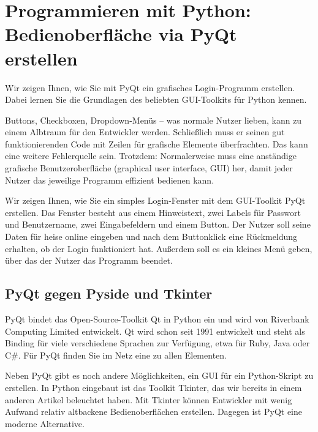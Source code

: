%
%
%



\chapter{Programmieren mit Python: Bedienoberfläche via PyQt erstellen}

Wir zeigen Ihnen, wie Sie mit PyQt ein grafisches Login-Programm erstellen. Dabei lernen Sie die Grundlagen des beliebten GUI-Toolkits für Python kennen.

Buttons, Checkboxen, Dropdown-Menüs – was normale Nutzer lieben, kann zu einem Albtraum für den Entwickler werden. Schließlich muss er seinen gut funktionierenden Code mit Zeilen für grafische Elemente überfrachten. Das kann eine weitere Fehlerquelle sein. Trotzdem: Normalerweise muss eine anständige grafische Benutzeroberfläche (graphical user interface, GUI) her, damit jeder Nutzer das jeweilige Programm effizient bedienen kann.

Wir zeigen Ihnen, wie Sie ein simples Login-Fenster mit dem GUI-Toolkit PyQt erstellen. Das Fenster besteht aus einem Hinweistext, zwei Labels für Passwort und Benutzername, zwei Eingabefeldern und einem Button. Der Nutzer soll seine Daten für heise online eingeben und nach dem Buttonklick eine Rückmeldung erhalten, ob der Login funktioniert hat. Außerdem soll es ein kleines Menü geben, über das der Nutzer das Programm beendet.

\section{PyQt gegen Pyside und Tkinter}


PyQt bindet das Open-Source-Toolkit Qt in Python ein und wird von Riverbank Computing Limited entwickelt. Qt wird schon seit 1991 entwickelt und steht als Binding für viele verschiedene Sprachen zur Verfügung, etwa für Ruby, Java oder C\#. Für PyQt finden Sie im Netz eine  zu allen Elementen.
 

Neben PyQt gibt es noch andere Möglichkeiten, ein GUI für ein Python-Skript zu erstellen. In Python eingebaut ist das Toolkit Tkinter, das wir bereits in einem anderen Artikel beleuchtet haben. Mit Tkinter können Entwickler mit wenig Aufwand relativ altbackene Bedienoberflächen erstellen. Dagegen ist PyQt eine moderne Alternative.
    
